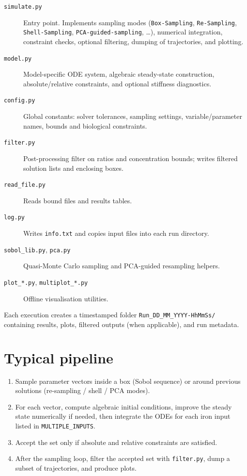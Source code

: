 \begin{description}
  \item[\texttt{simulate.py}] Entry point. Implements sampling modes
  (\texttt{Box-Sampling}, \texttt{Re-Sampling}, \texttt{Shell-Sampling},
  \texttt{PCA-guided-sampling}, \ldots), numerical integration, constraint
  checks, optional filtering, dumping of trajectories, and plotting.
  \item[\texttt{model.py}] Model-specific ODE system, algebraic steady-state
  construction, absolute/relative constraints, and optional stiffness
  diagnostics.
  \item[\texttt{config.py}] Global constants: solver tolerances, sampling
  settings, variable/parameter names, bounds and biological constraints.
  \item[\texttt{filter.py}] Post-processing filter on ratios and concentration
  bounds; writes filtered solution lists and enclosing boxes.
  \item[\texttt{read\_file.py}] Reads bound files and results tables.
  \item[\texttt{log.py}] Writes \texttt{info.txt} and copies input files into
  each run directory.
  \item[\texttt{sobol\_lib.py}, \texttt{pca.py}] Quasi-Monte Carlo sampling and
  PCA-guided resampling helpers.
  \item[\texttt{plot\_*.py}, \texttt{multiplot\_*.py}] Offline visualisation
  utilities.
\end{description}

Each execution creates a timestamped folder \texttt{Run\_DD\_MM\_YYYY-HhMmSs/}
containing results, plots, filtered outputs (when applicable), and run metadata.

\section{Typical pipeline}
\begin{enumerate}
  \item Sample parameter vectors inside a box (Sobol sequence) or around
  previous solutions (re-sampling / shell / PCA modes).
  \item For each vector, compute algebraic initial conditions, improve the
  steady state numerically if needed, then integrate the ODEs for each iron
  input listed in \texttt{MULTIPLE\_INPUTS}.
  \item Accept the set only if absolute and relative constraints are satisfied.
  \item After the sampling loop, filter the accepted set with
  \texttt{filter.py}, dump a subset of trajectories, and produce plots.
\end{enumerate}
